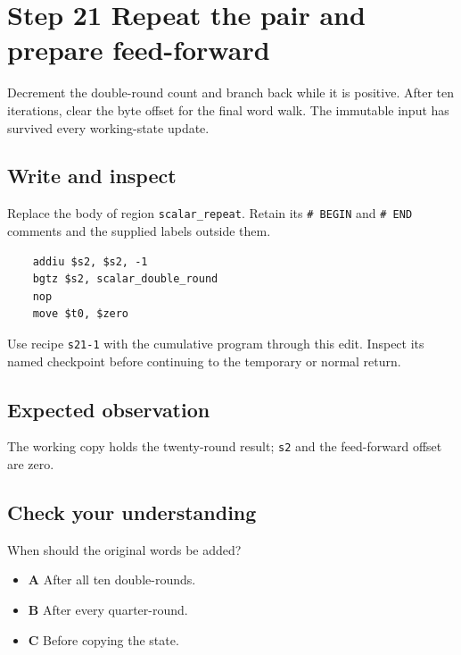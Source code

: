 \section{Step 21 Repeat the pair and prepare feed-forward}\label{chacha-s21}

Decrement the double-round count and branch back while it is positive. After ten iterations, clear the byte offset for the final word walk. The immutable input has survived every working-state update.

\subsection{Write and inspect}
Replace the body of region \texttt{scalar\_repeat}. Retain its \texttt{\# BEGIN} and \texttt{\# END} comments and the supplied labels outside them.

\begin{verbatim}
    addiu $s2, $s2, -1
    bgtz $s2, scalar_double_round
    nop
    move $t0, $zero
\end{verbatim}

Use recipe \texttt{s21-1} with the cumulative program through this edit. Inspect its named checkpoint before continuing to the temporary or normal return.

\subsection{Expected observation}
The working copy holds the twenty-round result; \texttt{s2} and the feed-forward offset are zero.

\subsection{Check your understanding}
When should the original words be added?

\begin{itemize}
  \item \textbf{A} After all ten double-rounds.
  \item \textbf{B} After every quarter-round.
  \item \textbf{C} Before copying the state.
\end{itemize}
